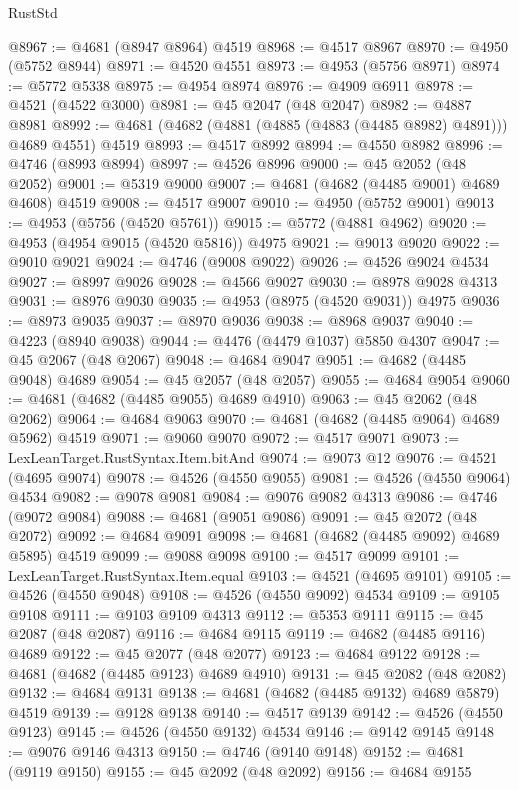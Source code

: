 \begin{lexlean}{RustStd}
\begin{coremodule}
@8967 := @4681 (@8947 @8964) @4519
@8968 := @4517 @8967
@8970 := @4950 (@5752 @8944)
@8971 := @4520 @4551
@8973 := @4953 (@5756 @8971)
@8974 := @5772 @5338
@8975 := @4954 @8974
@8976 := @4909 @6911
@8978 := @4521 (@4522 @3000)
@8981 := @45 @2047 (@48 @2047)
@8982 := @4887 @8981
@8992 := @4681 (@4682 (@4881 (@4885 (@4883 (@4485 @8982) @4891))) @4689 @4551) @4519
@8993 := @4517 @8992
@8994 := @4550 @8982
@8996 := @4746 (@8993 @8994)
@8997 := @4526 @8996
@9000 := @45 @2052 (@48 @2052)
@9001 := @5319 @9000
@9007 := @4681 (@4682 (@4485 @9001) @4689 @4608) @4519
@9008 := @4517 @9007
@9010 := @4950 (@5752 @9001)
@9013 := @4953 (@5756 (@4520 @5761))
@9015 := @5772 (@4881 @4962)
@9020 := @4953 (@4954 @9015 (@4520 @5816)) @4975
@9021 := @9013 @9020
@9022 := @9010 @9021
@9024 := @4746 (@9008 @9022)
@9026 := @4526 @9024 @4534
@9027 := @8997 @9026
@9028 := @4566 @9027
@9030 := @8978 @9028 @4313
@9031 := @8976 @9030
@9035 := @4953 (@8975 (@4520 @9031)) @4975
@9036 := @8973 @9035
@9037 := @8970 @9036
@9038 := @8968 @9037
@9040 := @4223 (@8940 @9038)
@9044 := @4476 (@4479 @1037) @5850 @4307
@9047 := @45 @2067 (@48 @2067)
@9048 := @4684 @9047
@9051 := @4682 (@4485 @9048) @4689
@9054 := @45 @2057 (@48 @2057)
@9055 := @4684 @9054
@9060 := @4681 (@4682 (@4485 @9055) @4689 @4910)
@9063 := @45 @2062 (@48 @2062)
@9064 := @4684 @9063
@9070 := @4681 (@4682 (@4485 @9064) @4689 @5962) @4519
@9071 := @9060 @9070
@9072 := @4517 @9071
@9073 := LexLeanTarget.RustSyntax.Item.bitAnd
@9074 := @9073 @12
@9076 := @4521 (@4695 @9074)
@9078 := @4526 (@4550 @9055)
@9081 := @4526 (@4550 @9064) @4534
@9082 := @9078 @9081
@9084 := @9076 @9082 @4313
@9086 := @4746 (@9072 @9084)
@9088 := @4681 (@9051 @9086)
@9091 := @45 @2072 (@48 @2072)
@9092 := @4684 @9091
@9098 := @4681 (@4682 (@4485 @9092) @4689 @5895) @4519
@9099 := @9088 @9098
@9100 := @4517 @9099
@9101 := LexLeanTarget.RustSyntax.Item.equal
@9103 := @4521 (@4695 @9101)
@9105 := @4526 (@4550 @9048)
@9108 := @4526 (@4550 @9092) @4534
@9109 := @9105 @9108
@9111 := @9103 @9109 @4313
@9112 := @5353 @9111
@9115 := @45 @2087 (@48 @2087)
@9116 := @4684 @9115
@9119 := @4682 (@4485 @9116) @4689
@9122 := @45 @2077 (@48 @2077)
@9123 := @4684 @9122
@9128 := @4681 (@4682 (@4485 @9123) @4689 @4910)
@9131 := @45 @2082 (@48 @2082)
@9132 := @4684 @9131
@9138 := @4681 (@4682 (@4485 @9132) @4689 @5879) @4519
@9139 := @9128 @9138
@9140 := @4517 @9139
@9142 := @4526 (@4550 @9123)
@9145 := @4526 (@4550 @9132) @4534
@9146 := @9142 @9145
@9148 := @9076 @9146 @4313
@9150 := @4746 (@9140 @9148)
@9152 := @4681 (@9119 @9150)
@9155 := @45 @2092 (@48 @2092)
@9156 := @4684 @9155

\end{coremodule}
\end{lexlean}
